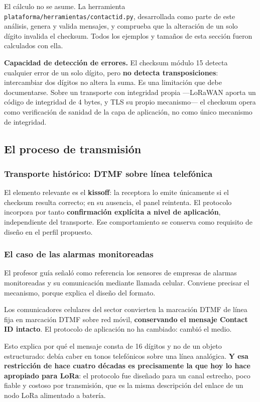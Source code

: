 \begin{cajaclave}[title={Verificación empírica}]
El cálculo no se asume. La herramienta \texttt{plataforma/herramientas/contactid.py}, desarrollada como
parte de este análisis, genera y valida mensajes, y comprueba que la alteración de un solo dígito
invalida el checksum. Todos los ejemplos y tamaños de esta sección fueron calculados con ella.
\end{cajaclave}

\textbf{Capacidad de detección de errores.} El checksum módulo 15 detecta cualquier error de un solo
dígito, pero \textbf{no detecta transposiciones}: intercambiar dos dígitos no altera la suma. Es una
limitación que debe documentarse. Sobre un transporte con integridad propia ---LoRaWAN aporta un código
de integridad de 4 bytes, y TLS su propio mecanismo--- el checksum opera como verificación de sanidad de
la capa de aplicación, no como único mecanismo de integridad.

\subsection{El proceso de transmisión}

\subsubsection{Transporte histórico: DTMF sobre línea telefónica}



El elemento relevante es el \textbf{kissoff}: la receptora lo emite únicamente si el checksum resulta
correcto; en su ausencia, el panel reintenta. El protocolo incorpora por tanto \textbf{confirmación
explícita a nivel de aplicación}, independiente del transporte. Ese comportamiento se conserva como
requisito de diseño en el perfil propuesto.

\subsubsection{El caso de las alarmas monitoreadas}

El profesor guía señaló como referencia los sensores de empresas de alarmas monitoreadas y su
comunicación mediante llamada celular. Conviene precisar el mecanismo, porque explica el diseño del
formato.

\begin{cajaclave}[title={La comunicación celular es un cambio de transporte, no de protocolo}]
Los comunicadores celulares del sector convierten la marcación DTMF de línea fija en marcación DTMF
sobre red móvil, \textbf{conservando el mensaje Contact ID intacto}. El protocolo de aplicación no ha
cambiado: cambió el medio.

Esto explica por qué el mensaje consta de 16 dígitos y no de un objeto estructurado: debía caber en
tonos telefónicos sobre una línea analógica. \textbf{Y esa restricción de hace cuatro décadas es
precisamente la que hoy lo hace apropiado para LoRa}: el protocolo fue diseñado para un canal estrecho,
poco fiable y costoso por transmisión, que es la misma descripción del enlace de un nodo LoRa
alimentado a batería.
\end{cajaclave}

